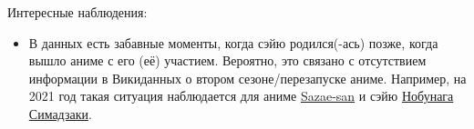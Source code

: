 Интересные наблюдения:
\begin{itemize}
    \item В данных есть забавные моменты, когда сэйю родился(-ась) позже, когда вышло аниме с его (её) участием. Вероятно, это связано с отсутствием информации в Викиданных о втором сезоне/перезапуске аниме. Например, на 2021 год такая ситуация наблюдается для аниме \href{https://www.wikidata.org/wiki/Q11304591}{Sazae-san} и сэйю \href{https://www.wikidata.org/wiki/Q5968283}{Нобунага Симадзаки}.
\end{itemize}